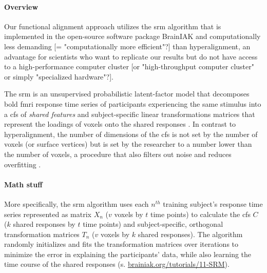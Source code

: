 

\paragraph{Overview}

Our functional alignment approach utilizes the \ac{srm} algorithm
\citep{chen2015reduced, richard2019fast} that is implemented in the open-source
software package BrainIAK \citep[Brain Imaging Analysis Kit;
\href{https://brainiak.org}{\url{brainiak.org}}][]{kumar2020brainiak,
kumar2020brainiaktutorial} and computationally less demanding [=
"computationally more efficient"?] than hyperalignment, an advantage for
scientists who want to replicate our results but do not have access to a
high-performance computer cluster [or "high-throughput computer cluster" or
simply "specialized hardware"?].

The \ac{srm} is an unsupervised probabilistic latent-factor model that
decomposes \ac{bold} \ac{fmri} response time series of participants experiencing
the same stimulus into a \ac{cfs} of \textit{shared features} \citep[also called
``\textit{shared feature space}'';][]{chen2015reduced} and subject-specific
linear transformations matrices that represent the loadings of voxels onto the
shared responses \citep{kumar2020brainiak, cohen2017computational}.
In contrast to hyperalignment, the number of dimensions of the \ac{cfs} is not
set by the number of voxels (or surface vertices) but is set by the researcher
to a number lower than the number of voxels, a procedure that also filters out
noise and reduces overfitting \citep{chen2015reduced}.


\paragraph{Math stuff}

More specifically, the \ac{srm} algorithm uses each $n^{th}$ training subject's
response time series represented as matrix $X_{n}$ ({$v$} voxels by $t$ time
points) to calculate the \ac{cfs} $C$ ($k$ shared responses by $t$ time points)
and subject-specific, orthogonal transformation matrices $T_{n}$ ($v$ voxels by
$k$ shared responses).
The algorithm randomly initializes and fits the transformation matrices over
iterations to minimize the error in explaining the participants' data, while
also learning the time course of the shared responses (s.
\href{https://brainiak.org/tutorials/11-SRM/}{\url{brainiak.org/tutorials/11-SRM}}).

